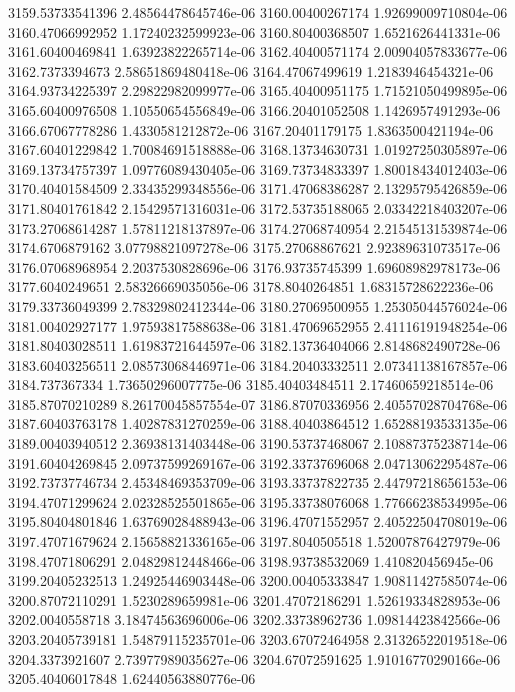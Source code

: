 {3159.53733541396 2.48564478645746e-06
3160.00400267174 1.92699009710804e-06
3160.47066992952 1.17240232599923e-06
3160.80400368507 1.6521626441331e-06
3161.60400469841 1.63923822265714e-06
3162.40400571174 2.00904057833677e-06
3162.7373394673 2.58651869480418e-06
3164.47067499619 1.2183946454321e-06
3164.93734225397 2.29822982099977e-06
3165.40400951175 1.71521050499895e-06
3165.60400976508 1.10550654556849e-06
3166.20401052508 1.1426957491293e-06
3166.67067778286 1.4330581212872e-06
3167.20401179175 1.8363500421194e-06
3167.60401229842 1.70084691518888e-06
3168.13734630731 1.01927250305897e-06
3169.13734757397 1.09776089430405e-06
3169.73734833397 1.80018434012403e-06
3170.40401584509 2.33435299348556e-06
3171.47068386287 2.13295795426859e-06
3171.80401761842 2.15429571316031e-06
3172.53735188065 2.03342218403207e-06
3173.27068614287 1.57811218137897e-06
3174.27068740954 2.21545131539874e-06
3174.6706879162 3.07798821097278e-06
3175.27068867621 2.92389631073517e-06
3176.07068968954 2.2037530828696e-06
3176.93735745399 1.69608982978173e-06
3177.6040249651 2.58326669035056e-06
3178.8040264851 1.68315728622236e-06
3179.33736049399 2.78329802412344e-06
3180.27069500955 1.25305044576024e-06
3181.00402927177 1.97593817588638e-06
3181.47069652955 2.41116191948254e-06
3181.80403028511 1.61983721644597e-06
3182.13736404066 2.8148682490728e-06
3183.60403256511 2.08573068446971e-06
3184.20403332511 2.07341138167857e-06
3184.737367334 1.73650296007775e-06
3185.40403484511 2.17460659218514e-06
3185.87070210289 8.26170045857554e-07
3186.87070336956 2.40557028704768e-06
3187.60403763178 1.40287831270259e-06
3188.40403864512 1.65288193533135e-06
3189.00403940512 2.36938131403448e-06
3190.53737468067 2.10887375238714e-06
3191.60404269845 2.09737599269167e-06
3192.33737696068 2.04713062295487e-06
3192.73737746734 2.45348469353709e-06
3193.33737822735 2.44797218656153e-06
3194.47071299624 2.02328525501865e-06
3195.33738076068 1.77666238534995e-06
3195.80404801846 1.63769028488943e-06
3196.47071552957 2.40522504708019e-06
3197.47071679624 2.15658821336165e-06
3197.8040505518 1.52007876427979e-06
3198.47071806291 2.04829812448466e-06
3198.93738532069 1.410820456945e-06
3199.20405232513 1.24925446903448e-06
3200.00405333847 1.90811427585074e-06
3200.87072110291 1.5230289659981e-06
3201.47072186291 1.52619334828953e-06
3202.0040558718 3.18474563696006e-06
3202.33738962736 1.09814423842566e-06
3203.20405739181 1.54879115235701e-06
3203.67072464958 2.31326522019518e-06
3204.3373921607 2.73977989035627e-06
3204.67072591625 1.91016770290166e-06
3205.40406017848 1.62440563880776e-06
}
